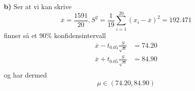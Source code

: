 \documentclass{report}
\newcommand{\nbrack}[1]{\left( #1 \right)}
\begin{document}
\textbf{b)}
Ser at vi kan skrive
\begin{equation}
  \label{eq:29}
  \overline{x} = \frac{1591}{20}, S^{2} = \frac{1}{19} \sum_{i=1}^{20} \nbrack{ x_{i} - \overline{x} }^{2} = 192.471
\end{equation}
finner så et $90\%$ konfidensintervall
\begin{equation}
  \label{eq:30}
  \begin{split}
    \overline{x} - t_{0.05} \frac{S}{\sqrt{n}} &= 74.20 \\
    \overline{x} + t_{0.05} \frac{S}{\sqrt{n}} &= 84.90 \\
  \end{split}
\end{equation}
og har dermed
\begin{equation}
  \label{eq:31}
  \mu \in \nbrack{74.20, 84.90}
\end{equation}
\end{document}
